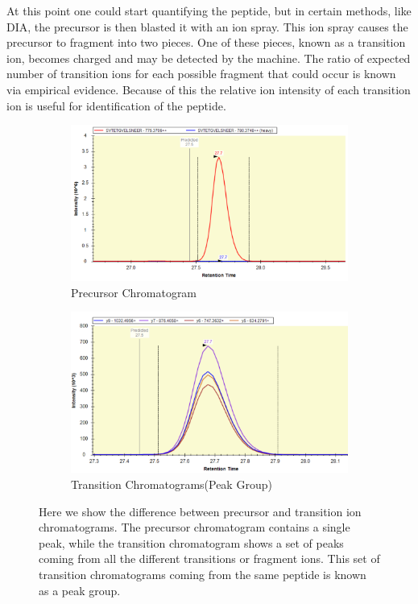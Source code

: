 \documentclass[12pt]{article}
\begin{document}
At this point one could start quantifying the peptide, but in certain methods, like DIA, the precursor is then blasted it with an ion spray. This ion spray causes the precursor to fragment into two pieces. One of these pieces, known as a transition ion, becomes charged and may be detected by the machine. The ratio of expected number of transition ions for each possible fragment that could occur is known via empirical evidence. Because of this the relative ion intensity of each transition ion is useful for identification of the peptide.

\begin{figure}
\centering
\begin{subfigure}{.5\textwidth}
  \centering
  \includegraphics[width=1\linewidth]{precursor}
  \caption{Precursor Chromatogram}
  \label{fig:sub1}
\end{subfigure}%
\begin{subfigure}{.5\textwidth}
  \centering
  \includegraphics[width=1\linewidth]{transitions}
  \caption{Transition Chromatograms(Peak Group)}
  \label{fig:sub2}
\end{subfigure}
\caption{Here we show the difference between precursor and transition ion chromatograms. The precursor chromatogram contains a single peak, while the transition chromatogram shows a set of peaks coming from all the different transitions or fragment ions. This set of transition chromatograms coming from the same peptide is known as a peak group.}
\label{fig:test}
\end{figure}
\end{document}
